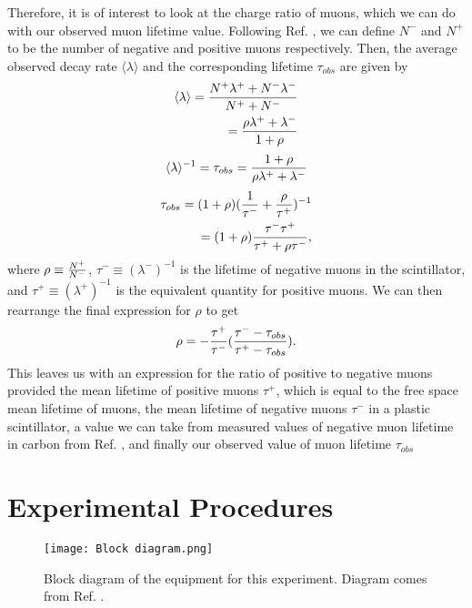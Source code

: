 \documentclass[11pt,letterpaper]{article}
\begin{document}
Therefore, it is of interest to look at the charge ratio of muons, which we can do with our observed muon lifetime value. Following Ref. \cite{Coan}, we can define $N^-$ and $N^+$ to be the number of negative and positive muons respectively. Then, the average observed decay rate $\langle\lambda\rangle$ and the corresponding lifetime $\tau_{obs}$ are given by
\begin{align}
    \langle\lambda\rangle = {N^+ \lambda^+ + N^- \lambda^- \over N^+ + N^-} \\
    = {\rho \lambda^+ + \lambda^- \over 1 + \rho}
\end{align}
\begin{equation}
    \langle\lambda\rangle^{-1} = \tau_{obs} = {1 + \rho \over \rho \lambda^+ + \lambda^-}
\end{equation}
\begin{align}
    \tau_{obs} = (1 + \rho) ({1 \over \tau^-} + {\rho \over \tau^+})^{-1} \\
    = (1 + \rho) {\tau^- \tau^+ \over \tau^+ + \rho \tau^-} ,
\end{align}
where $\rho \equiv {N^+ \over N^-}$, $\tau^- \equiv (\lambda^-)^{-1}$ is the lifetime of negative muons in the scintillator, and $\tau^+ \equiv (\lambda^+)^{-1}$ is the equivalent quantity for positive muons. We can then rearrange the final expression for $\rho$ to get
\begin{equation}
    \rho = - {\tau^+ \over \tau^-} ({\tau^- - \tau_{obs} \over \tau^+ - \tau_{obs}}) .
\end{equation}
This leaves us with an expression for the ratio of positive to negative muons provided the mean lifetime of positive muons $\tau^+$, which is equal to the free space mean lifetime of muons, the mean lifetime of negative muons $\tau^-$ in a plastic scintillator, a value we can take from measured values of negative muon lifetime in carbon from Ref. \cite{Reiter}, and finally our observed value of muon lifetime $\tau_{obs}$

\section{Experimental Procedures}

\begin{figure}
\centerline{\texttt{[image: Block diagram.png]}}
\caption{Block diagram of the equipment for this experiment. Diagram comes from Ref. \cite{Coan}.}
\end{figure}
\label{Block Diagram}
\end{document}
